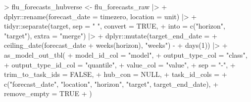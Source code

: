 \documentclass[
  letterpaper,
  DIV=11,
  numbers=noendperiod]{scrartcl}
\newenvironment{Shaded}{\begin{snugshade}}{\end{snugshade}}
\newcommand{\AttributeTok}[1]{\textcolor[rgb]{0.40,0.45,0.13}{#1}}
\newcommand{\ConstantTok}[1]{\textcolor[rgb]{0.56,0.35,0.01}{#1}}
\newcommand{\DecValTok}[1]{\textcolor[rgb]{0.68,0.00,0.00}{#1}}
\newcommand{\FunctionTok}[1]{\textcolor[rgb]{0.28,0.35,0.67}{#1}}
\newcommand{\NormalTok}[1]{\textcolor[rgb]{0.00,0.23,0.31}{#1}}
\newcommand{\OtherTok}[1]{\textcolor[rgb]{0.00,0.23,0.31}{#1}}
\newcommand{\SpecialCharTok}[1]{\textcolor[rgb]{0.37,0.37,0.37}{#1}}
\newcommand{\StringTok}[1]{\textcolor[rgb]{0.13,0.47,0.30}{#1}}
\begin{document}
\begin{Shaded}
\begin{Highlighting}[]
\SpecialCharTok{\textgreater{}}\NormalTok{ flu\_forecasts\_hubverse }\OtherTok{\textless{}{-}}\NormalTok{ flu\_forecasts\_raw }\SpecialCharTok{|\textgreater{}}
\SpecialCharTok{+}\NormalTok{     dplyr}\SpecialCharTok{::}\FunctionTok{rename}\NormalTok{(}\AttributeTok{forecast\_date =}\NormalTok{ timezero, }\AttributeTok{location =}\NormalTok{ unit) }\SpecialCharTok{|\textgreater{}}
\SpecialCharTok{+}\NormalTok{     tidyr}\SpecialCharTok{::}\FunctionTok{separate}\NormalTok{(target, }\AttributeTok{sep =} \StringTok{" "}\NormalTok{, }\AttributeTok{convert =} \ConstantTok{TRUE}\NormalTok{,}
\SpecialCharTok{+}                     \AttributeTok{into =} \FunctionTok{c}\NormalTok{(}\StringTok{"horizon"}\NormalTok{, }\StringTok{"target"}\NormalTok{), }\AttributeTok{extra =} \StringTok{"merge"}\NormalTok{) }\SpecialCharTok{|\textgreater{}}
\SpecialCharTok{+}\NormalTok{     dplyr}\SpecialCharTok{::}\FunctionTok{mutate}\NormalTok{(}\AttributeTok{target\_end\_date =} 
\SpecialCharTok{+}                     \FunctionTok{ceiling\_date}\NormalTok{(forecast\_date }\SpecialCharTok{+} \FunctionTok{weeks}\NormalTok{(horizon), }\StringTok{"weeks"}\NormalTok{) }\SpecialCharTok{{-}}
\SpecialCharTok{+}                       \FunctionTok{days}\NormalTok{(}\DecValTok{1}\NormalTok{)) }\SpecialCharTok{|\textgreater{}}
\SpecialCharTok{+}     \FunctionTok{as\_model\_out\_tbl}\NormalTok{(}
\SpecialCharTok{+}       \AttributeTok{model\_id\_col =} \StringTok{"model"}\NormalTok{,}
\SpecialCharTok{+}       \AttributeTok{output\_type\_col =} \StringTok{"class"}\NormalTok{,}
\SpecialCharTok{+}       \AttributeTok{output\_type\_id\_col =} \StringTok{"quantile"}\NormalTok{,}
\SpecialCharTok{+}       \AttributeTok{value\_col =} \StringTok{"value"}\NormalTok{,}
\SpecialCharTok{+}       \AttributeTok{sep =} \StringTok{"{-}"}\NormalTok{,}
\SpecialCharTok{+}       \AttributeTok{trim\_to\_task\_ids =} \ConstantTok{FALSE}\NormalTok{,}
\SpecialCharTok{+}       \AttributeTok{hub\_con =} \ConstantTok{NULL}\NormalTok{,}
\SpecialCharTok{+}       \AttributeTok{task\_id\_cols =} 
\SpecialCharTok{+}         \FunctionTok{c}\NormalTok{(}\StringTok{"forecast\_date"}\NormalTok{, }\StringTok{"location"}\NormalTok{, }\StringTok{"horizon"}\NormalTok{, }\StringTok{"target"}\NormalTok{, target\_end\_date),}
\SpecialCharTok{+}       \AttributeTok{remove\_empty =} \ConstantTok{TRUE}
\SpecialCharTok{+}\NormalTok{     )}
\end{Highlighting}
\end{Shaded}
\end{document}
